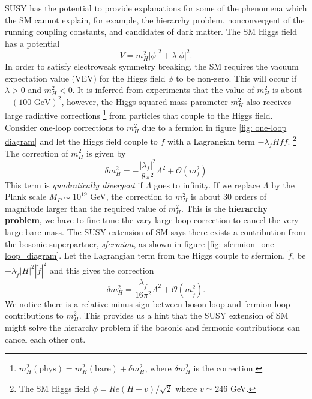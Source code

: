 \documentclass[12pt]{report}
\begin{document}
SUSY has the potential to provide explanations for some of the phenomena which the SM cannot explain, for example, the hierarchy problem, nonconvergent of the running coupling constants, and candidates of dark matter.
The SM Higgs field has a potential
\begin{equation}
V = m^{2}_{H} |\phi|^{2} + \lambda |\phi|^{2} .
\end{equation}
In order to satisfy electroweak symmetry breaking, the SM requires the vacuum expectation value (VEV) for the Higgs field $\phi$ to be non-zero.
This will occur if $\lambda > 0$ and $m^{2}_{H} < 0$.
It is inferred from experiments that the value of $m^{2}_{H}$ is about $-(100 \textrm{ GeV})^2$, however, the Higgs squared mass parameter $m^{2}_{H}$ also receives large radiative corrections \footnote{$m^{2}_{H} (\textrm{phys}) = m^{2}_{H} (\textrm{bare}) + \delta m^{2}_{H}$, where $\delta m^{2}_{H}$ is the correction.} from particles that couple to the Higgs field.
Consider one-loop corrections to $m^{2}_{H}$ due to a fermion in figure \ref{fig: one-loop diagram} and let the Higgs field couple to $f$ with a Lagrangian term $-\lambda_{f} H f \overline{f}$. \footnote{The SM Higgs field $\phi =Re(H - v)/\sqrt{2}$ where $v \simeq 246$ GeV.}
The correction of $m^{2}_{H}$ is given by
\begin{equation}
\delta m^{2}_{H} = - \frac{|\lambda_{f}|^2}{8 \pi^{2}} \Lambda^{2} + \mathcal{O}(m^{2}_{f})
\end{equation}
This term is \textit{quadratically divergent} if $\Lambda$ goes to infinity.
If we replace $\Lambda$ by the Plank scale $M_{P} \sim 10^{19}$ GeV, the correction to $m^{2}_{H}$ is about 30 orders of magnitude larger than the required value of $m^{2}_{H}$.
This is the \textbf{hierarchy problem}, we have to fine tune the vary large loop correction to cancel the very large bare mass.
The SUSY extension of SM says there exists a contribution from the bosonic superpartner, \textit{sfermion}, as shown in figure \ref{fig: sfermion_one-loop_diagram}.
Let the Lagrangian term from the Higgs couple to sfermion, $\widetilde{f}$, be $-\lambda_{\widetilde{f}} |H|^{2} |\widetilde{f}|^{2}$ and this gives the correction
\begin{equation}
\delta m^{2}_{H} = \frac{\lambda_{\widetilde{f}}}{16 \pi^{2}} \Lambda^{2} + \mathcal{O}(m^{2}_{\widetilde{f}}) .
\end{equation}
We notice there is a relative minus sign between boson loop and fermion loop contributions to $m^{2}_{H}$.
This provides us a hint that the SUSY extension of SM might solve the hierarchy problem if the bosonic and fermonic contributions can cancel each other out.
\end{document}
